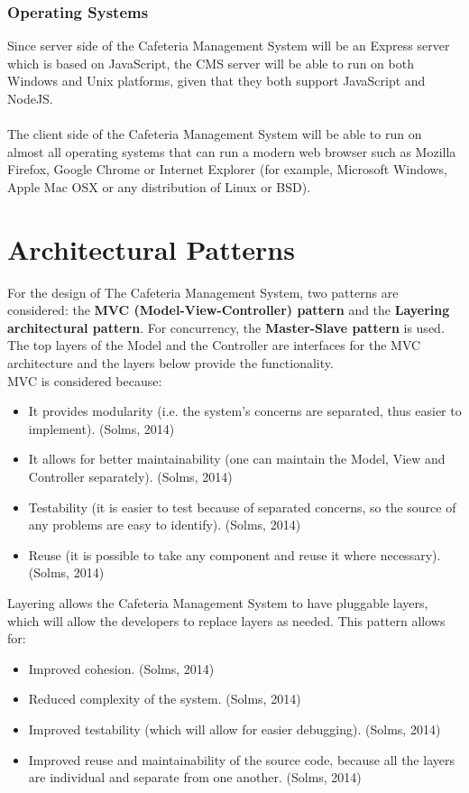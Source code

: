 \documentclass[a4paper,12pt]{article}
\begin{document}
\subsubsection{Operating Systems}
Since server side of the Cafeteria Management System will be an Express server which is based on JavaScript, the CMS server will be able to run on both Windows and Unix platforms, given that they both support JavaScript and NodeJS.\\
\\
The client side of the Cafeteria Management System will be able to run on almost all operating systems that can run a modern web browser such as Mozilla Firefox, Google Chrome or Internet Explorer (for example, Microsoft Windows, Apple Mac OSX or any distribution of Linux or BSD).

\section{Architectural Patterns}
		For the design of The Cafeteria Management System, two patterns are considered: the \textbf{MVC (Model-View-Controller) pattern} and the \textbf{Layering architectural pattern}. For concurrency, the \textbf{Master-Slave pattern} is used.\\
		The top layers of the Model and the Controller are interfaces for the MVC architecture and the layers below provide the functionality.\\
		MVC is considered because:
		\begin{itemize}
			\item It provides modularity (i.e. the system's concerns are separated, thus easier to implement). (Solms, 2014)
			\item It allows for better maintainability (one can maintain the Model, View and Controller separately). (Solms, 2014)
			\item Testability (it is easier to test because of separated concerns, so the source of any problems are easy to identify). (Solms, 2014)
			\item Reuse (it is possible to take any component and reuse it where necessary). (Solms, 2014)
		\end{itemize} 
		Layering allows the Cafeteria Management System to have pluggable layers, which will allow the developers to replace layers as needed.
		This pattern allows for: 
		\begin{itemize}
			\item Improved cohesion. (Solms, 2014)
			\item Reduced complexity of the system. (Solms, 2014)
			\item Improved testability (which will allow for easier debugging). (Solms, 2014)
			\item Improved reuse and maintainability of the source code, because all the layers are individual and separate from one another. (Solms, 2014)
		\end{itemize}
\end{document}
